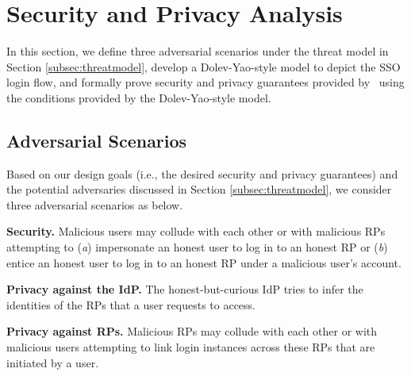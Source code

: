 \section{Security and Privacy Analysis}
\label{sec:analysis}
In this section, we define three adversarial scenarios under the threat model in Section \ref{subsec:threatmodel}, develop a Dolev-Yao-style model \cite{SPRESSO} to depict the SSO login flow, and formally prove security and privacy guarantees provided by \usso~using the conditions provided by the Dolev-Yao-style model.

\newc
\subsection{Adversarial Scenarios}

Based on our design goals (i.e., the desired security and privacy guarantees) and the potential adversaries discussed in Section \ref{subsec:threatmodel}, we consider three adversarial scenarios as below.

\noindent\textbf{Security.} Malicious users may collude with each other or with malicious RPs attempting to (\emph{a}) impersonate an honest user to log in to an honest RP or (\emph{b}) entice an honest user to log in to an honest RP under a malicious user's account.

\noindent\textbf{Privacy against the IdP.}
The honest-but-curious IdP tries to infer the identities of the RPs that a user requests to access. %

\noindent\textbf{Privacy against RPs.}
Malicious RPs may collude with each other or with malicious users attempting to link login instances across these RPs that are initiated by a user.



